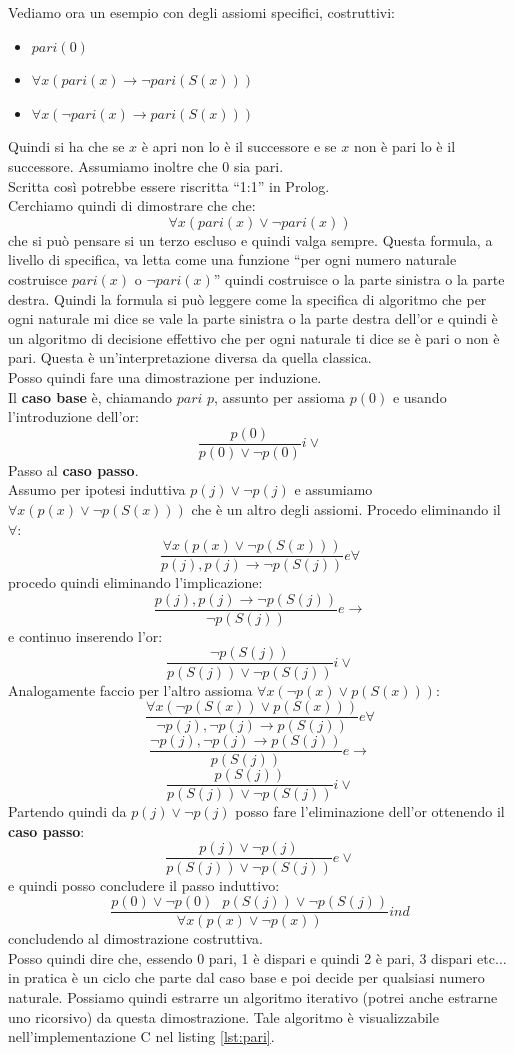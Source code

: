 \documentclass[a4paper,12pt, oneside]{book}
\begin{document}
\begin{esempio}
  Vediamo ora un esempio con degli assiomi specifici, costruttivi:
  \begin{itemize}
    \item $pari(0)$
    \item $\forall x(pari(x)\to \neg pari(S(x)))$
    \item $\forall x(\neg pari(x)\to pari(S(x)))$
  \end{itemize}
  Quindi si ha che se $x$ è apri non lo è il successore e se $x$ non è pari lo è
  il successore. Assumiamo inoltre che 0 sia pari.\\
  \textup{Scritta così potrebbe essere riscritta ``1:1'' in Prolog.}\\
  Cerchiamo quindi di dimostrare che che:
  \[\forall x(pari(x)\lor \neg pari(x))\]
  che si può pensare si un terzo escluso e quindi valga sempre. Questa formula,
  a 
  livello di specifica, va letta come una funzione ``per ogni numero naturale
  costruisce $pari(x)$ o $\neg pari(x)$'' quindi costruisce o la parte sinistra
  o 
  la parte destra. Quindi la formula si può leggere come la specifica di
  algoritmo 
  che per ogni naturale mi dice se vale la parte sinistra o la parte destra
  dell'or e quindi è un algoritmo di decisione effettivo che per ogni naturale
  ti 
  dice se è pari o non è pari. Questa è un'interpretazione diversa da quella
  classica. \\
  Posso quindi fare una dimostrazione per induzione.\\
  Il \textbf{caso base} è, chiamando $pari$ $p$, assunto per assioma $p(0)$ e
  usando l'introduzione dell'or:
  \[\frac{p(0)}{p(0)\lor \neg p(0)}i\lor\]
  Passo al \textbf{caso passo}.\\
  Assumo per ipotesi induttiva $p(j)\lor \neg p(j)$ e assumiamo $\forall
  x(p(x)\lor \neg p(S(x)))$ che è un altro degli assiomi. Procedo eliminando il
  $\forall$:
  \[\frac{\forall x(p(x)\lor \neg p(S(x)))}{p(j),p(j)\to\neg
      p(S(j))}e\forall\]
  procedo quindi eliminando l'implicazione:
  \[\frac{p(j),p(j)\to\neg
      p(S(j))}{\neg p(S(j))}e\to\]
  e continuo inserendo l'or:
  \[\frac{\neg p(S(j))}{p(S(j))\lor\neg p(S(j))}i\lor\]
  Analogamente faccio per l'altro assioma $\forall x(\neg p(x)\lor p(S(x)))$:
  \[\frac{\forall x(\neg p(S(x) )\lor  p(S(x)))}{\neg p(j),\neg p(j)\to
      p(S(j))}e\forall\]
  \[\frac{\neg p(j),\neg p(j)\to
      p(S(j))}{p(S(j))}e\to\]
  \[\frac{p(S(j))}{p(S(j))\lor\neg p(S(j))}i\lor\]
  Partendo quindi da $p(j)\lor \neg p(j)$ posso fare l'eliminazione dell'or
  ottenendo il \textbf{caso passo}:
  \[\frac{p(j)\lor\neg p(j)}{p(S(j))\lor\neg p(S(j))}e\lor\]
  e quindi posso concludere il passo induttivo:
  \[\frac{p(0)\lor \neg p(0)\,\,\,\,p(S(j))\lor\neg p(S(j))}{\forall
      x(p(x)\lor \neg p(x))}ind\]
  concludendo al dimostrazione costruttiva.\\
  Posso quindi dire che, essendo 0 pari, 1 è dispari e quindi 2 è pari, 3
  dispari etc$\ldots$ in pratica è un ciclo che parte dal caso base e poi decide
  per qualsiasi numero naturale. Possiamo quindi estrarre un algoritmo iterativo
  (potrei anche estrarne uno ricorsivo) da questa dimostrazione. Tale algoritmo
  è visualizzabile nell'implementazione C nel listing \ref{lst:pari}.
\end{esempio}
\end{document}

